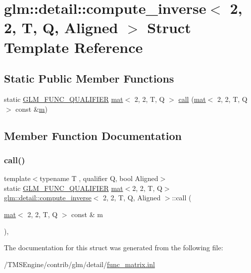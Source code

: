 \hypertarget{structglm_1_1detail_1_1compute__inverse_3_012_00_012_00_01_t_00_01_q_00_01_aligned_01_4}{}\section{glm\+:\+:detail\+:\+:compute\+\_\+inverse$<$ 2, 2, T, Q, Aligned $>$ Struct Template Reference}
\label{structglm_1_1detail_1_1compute__inverse_3_012_00_012_00_01_t_00_01_q_00_01_aligned_01_4}
\subsection*{Static Public Member Functions}
\begin{DoxyCompactItemize}
\item 
static \hyperlink{setup_8hpp_a33fdea6f91c5f834105f7415e2a64407}{G\+L\+M\+\_\+\+F\+U\+N\+C\+\_\+\+Q\+U\+A\+L\+I\+F\+I\+ER} \hyperlink{structglm_1_1mat}{mat}$<$ 2, 2, T, Q $>$ \hyperlink{structglm_1_1detail_1_1compute__inverse_3_012_00_012_00_01_t_00_01_q_00_01_aligned_01_4_abc2ed8842638094e0aa6df0285997eb9}{call} (\hyperlink{structglm_1_1mat}{mat}$<$ 2, 2, T, Q $>$ const \&\hyperlink{_s_d_l__opengl__glext_8h_af593500c283bf1a787a6f947f503a5c2}{m})
\end{DoxyCompactItemize}


\subsection{Member Function Documentation}
\mbox{\label{structglm_1_1detail_1_1compute__inverse_3_012_00_012_00_01_t_00_01_q_00_01_aligned_01_4_abc2ed8842638094e0aa6df0285997eb9}} 
\subsubsection{\texorpdfstring{call()}{call()}}
{\footnotesize\ttfamily template$<$typename T , qualifier Q, bool Aligned$>$ \\
static \hyperlink{setup_8hpp_a33fdea6f91c5f834105f7415e2a64407}{G\+L\+M\+\_\+\+F\+U\+N\+C\+\_\+\+Q\+U\+A\+L\+I\+F\+I\+ER} \hyperlink{structglm_1_1mat}{mat}$<$2, 2, T, Q$>$ \hyperlink{structglm_1_1detail_1_1compute__inverse}{glm\+::detail\+::compute\+\_\+inverse}$<$ 2, 2, T, Q, Aligned $>$\+::call (\begin{DoxyParamCaption}\item[{\hyperlink{structglm_1_1mat}{mat}$<$ 2, 2, T, Q $>$ const \&}]{m }\end{DoxyParamCaption})\hspace{0.3cm}{\ttfamily [inline]}, {\ttfamily [static]}}



The documentation for this struct was generated from the following file\+:\begin{DoxyCompactItemize}
\item 
/\+T\+M\+S\+Engine/contrib/glm/detail/\hyperlink{func__matrix_8inl}{func\+\_\+matrix.\+inl}\end{DoxyCompactItemize}
